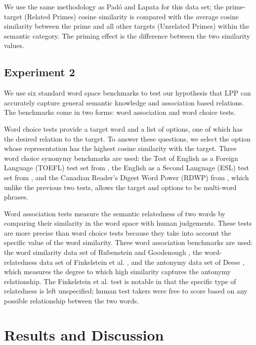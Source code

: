 \documentclass[11pt]{article}
\begin{document}
We use the same methodology as Pad\'{o} and Lapata 
for this data set; the prime-target (Related Primes) cosine similarity is
compared with the average cosine similarity between the prime and all other
targets (Unrelated Primes) within the semantic category.  The priming effect
is the difference between the two similarity values.

\subsection{Experiment 2}
We use six standard word space benchmarks to test our hypothesis that LPP can
accurately capture general semantic knowledge and association based relations.
The benchmarks come in two forms: word association and word choice tests.

Word choice tests provide a target word and a list of options, one of which has
the desired relation to the target.  To answer these questions, we select the
option whose representation has the highest cosine similarity with the target.
Three word choice synonymy benchmarks are used: the Test of English as a Foreign
Language (TOEFL) test set from \cite{landauer98introduction}, the English as a
Second Language (ESL) test set from \cite{turney01mining}, and the Canadian
Reader's Digest Word Power (RDWP) from \cite{jarmasz03rogets}, which unlike the
previous two tests, allows the target and options to be multi-word phrases.

Word association tests measure the semantic relatedness of two words by
comparing their similarity in the word space with human judgements.  These tests
are more precise than word choice tests because they take into account the
specific value of the word similarity.  Three word association benchmarks are
used: the word similarity data set of Rubenstein and Goodenough
, the word-relatedness data set of Finkelstein
et al. , and the antonymy data set of Deese
, which measures the degree to which high
similarity captures the antonymy relationship.  The Finkelstein et al. test is
notable in that the specific type of relatedness is left unspecified; human test
takers were free to score based on any possible relationship between the two
words.

\section{Results and Discussion}
\end{document}
